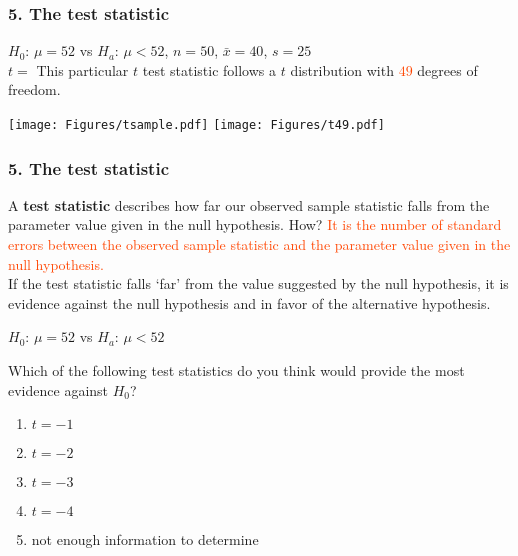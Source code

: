 \begin{frame}
\frametitle{5. The test statistic}
$H_0$: $\mu=52$ vs $H_a$: $\mu < 52$, $n=50$, $\bar{x}=40$, $s=25$  \\
\vskip10pt
$\displaystyle t = $
\vskip10pt
This particular $t$ test statistic follows a $t$ distribution with \textcolor{OrangeRed}{$49$} degrees of freedom.
\begin{center}
\texttt{[image: Figures/tsample.pdf]} \hspace{0.2in}
\texttt{[image: Figures/t49.pdf]}
\end{center}
\end{frame}

\begin{frame}
\frametitle{5. The test statistic}
A \textbf{test statistic} describes how far our observed sample statistic falls from the parameter value given in the null hypothesis.  How?
 \textcolor{OrangeRed}{It is the number of standard errors between the observed sample statistic and the parameter value given in the null hypothesis.}\\
\vskip10pt
If the test statistic falls `far' from the value suggested by the null hypothesis, it is evidence against the null hypothesis and in favor of the alternative hypothesis.
\end{frame}

\begin{frame}
$H_0$: $\mu=52$ vs $H_a$: $\mu < 52$\\
\begin{clicker}{Which of the following test statistics do you think would provide the most evidence against $H_0$?}
\begin{enumerate}
    \item
    $t=-1$
    \item
    $t=-2$
    \item
    $t=-3$
    \item
    $t=-4$
    \item
    not enough information to determine
\end{enumerate}
\end{clicker}
\end{frame}


